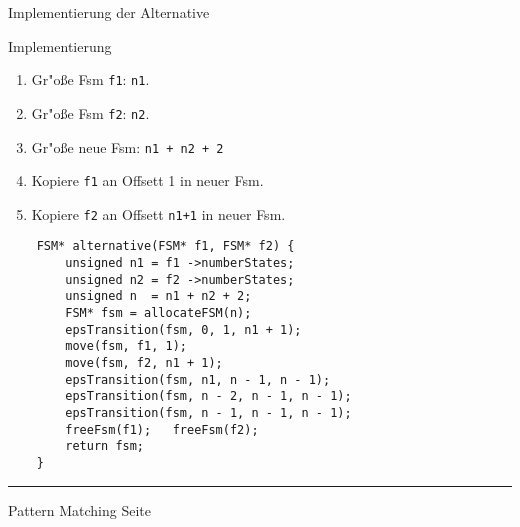 \begin{slide}{}
\normalsize

\begin{center}
Implementierung der Alternative
\end{center}
\vspace*{0.5cm}

\footnotesize
\hspace*{-1cm}

Implementierung
\begin{enumerate}
\item Gr"o{\ss}e Fsm \texttt{f1}: \texttt{n1}.
\item Gr"o{\ss}e Fsm \texttt{f2}: \texttt{n2}.
\item Gr"o{\ss}e neue Fsm: \texttt{n1 + n2 + 2}
\item Kopiere \texttt{f1} an Offsett 1 in neuer Fsm.
\item Kopiere \texttt{f2} an Offsett \texttt{n1+1} in neuer Fsm.
\end{enumerate}

\begin{verbatim}
    FSM* alternative(FSM* f1, FSM* f2) {
        unsigned n1 = f1 ->numberStates;
        unsigned n2 = f2 ->numberStates;
        unsigned n  = n1 + n2 + 2;
        FSM* fsm = allocateFSM(n);
        epsTransition(fsm, 0, 1, n1 + 1);
        move(fsm, f1, 1);
        move(fsm, f2, n1 + 1);
        epsTransition(fsm, n1, n - 1, n - 1);
        epsTransition(fsm, n - 2, n - 1, n - 1);
        epsTransition(fsm, n - 1, n - 1, n - 1);
        freeFsm(f1);   freeFsm(f2);
        return fsm;
    }
\end{verbatim}


\vspace*{\fill}
\tiny \addtocounter{mypage}{1}
\rule{17cm}{1mm}
Pattern Matching \hspace*{\fill} Seite 
\end{slide}


